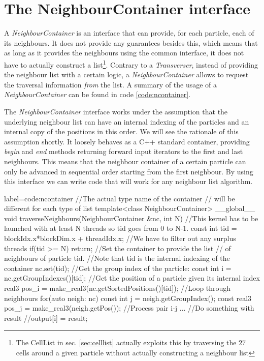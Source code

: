 \documentclass[ twoside,openright,titlepage,numbers=noenddot,%
headinclude,footinclude,cleardoublepage=empty,abstract=on,
BCOR=5mm,paper=a4,fontsize=11pt, dvipsnames
]{scrreprt}
\begin{document}
\section{The NeighbourContainer interface}\label{sec:ncontainer}
A \emph{NeighbourContainer} is an interface that can provide, for each particle, each of its neighbours. It does not provide any guarantees besides this, which means that as long as it provides the neighbours using the common interface, it does not have to actually construct a list\footnote{The CellList in sec. \ref{sec:celllist} actually exploits this by traversing the $27$ cells around a given particle without actually constructing a neighbour list}. Contrary to a \emph{Transverser}, instead of providing the neighbour list with a certain logic, a \emph{NeighbourContainer} allows to request the traversal information \emph{from} the list. A summary of the usage of a \emph{NeighbourContainer} can be found in code \ref{code:ncontainer}.

The \emph{NeighbourContainer} interface works under the assumption that the underlying neighbour list can have an internal indexing of the particles and an internal copy of the positions in this order. We will see the rationale of this assumption shortly.
It loosely behaves as a C++ standard container, providing \emph{begin} and \emph{end} methods returning forward input iterators to the first and last neighbours. This means that the neighbour container of a certain particle can only be advanced in sequential order starting from the first neighbour.
By using this interface we can write code that will work for any neighbour list algorithm.

\begin{code2}
{label=code:ncontainer}
//The actual type name of the container
//  will be different for each type of list
template<class NeighbourContainer>
__global__ void traverseNeighbours(NeighbourContainer &nc, int N){
  //This kernel has to be launched with at least N threads so tid goes from 0 to N-1.
  const int tid = blockIdx.x*blockDim.x + threadIdx.x;
  //We have to filter out any surplus threads
  if(tid >= N) return;                                   
  //Set the container to provide the list 
  // of neighbours of particle tid.
  //Note that tid is the internal indexing of the container
  nc.set(tid);
  //Get the group index of the particle:
  const int i = nc.getGroupIndexes()[tid];
  //Get the position of a particle given its internal index
  real3 pos_i = make_real3(nc.getSortedPositions()[tid]);
  //Loop through neighbours
  for(auto neigh: nc){
    const int j = neigh.getGroupIndex();
    const real3 pos_j = make_real3(neigh.getPos());
    //Process pair i-j
    ...
  }
  //Do something with result
  //output[i] = result;
  }
\end{code2}
\end{document}
